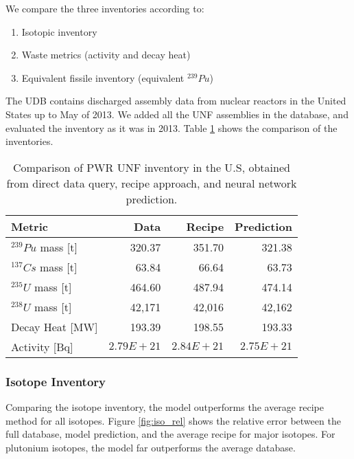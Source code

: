 We compare the three inventories according to:
\begin{enumerate}
    \item Isotopic inventory
    \item Waste metrics (activity and decay heat)
    \item Equivalent fissile inventory (equivalent $^{239}Pu$)
\end{enumerate}

The \gls{UDB} contains discharged assembly data
from nuclear reactors in the United States up to May of
2013. We added all the \gls{UNF} assemblies in the database,
and evaluated the inventory as it was in 2013. 
Table \ref{tab:met} shows the comparison of the inventories.

\begin{table}[h]
    \centering
    \begin{tabular}{l|r|rr}
        \hline
        Metric & Data & Recipe & Prediction \\
        \hline
        $^{239}Pu$ mass [t] & 320.37 & 351.70 & 321.38\\
        $^{137}Cs$ mass [t] & 63.84 & 66.64 & 63.73 \\
        $^{235}U$ mass [t] & 464.60 & 487.94 & 474.14\\
        $^{238}U$ mass [t] & 42,171 & 42,016 & 42,162\\
        \hline
        Decay Heat [MW] & 193.39 & 198.55 & 193.33 \\
        Activity [Bq] & $2.79E+21$ & $2.84E+21$ & $2.75E+21$ \\
        \hline
    \end{tabular}
    \caption{Comparison of \gls{PWR} \gls{UNF} inventory in the U.S,
             obtained from direct data query, recipe approach,
             and neural network prediction. 
    \label{tab:met}}
\end{table}

\FloatBarrier

\subsubsection{Isotope Inventory}

Comparing the isotope inventory, the model outperforms the
average recipe method for all isotopes.
Figure \ref{fig:iso_rel} shows the relative
error between the full database, model prediction, and
the average recipe for
major isotopes. For plutonium isotopes, the model far
outperforms the average database.

